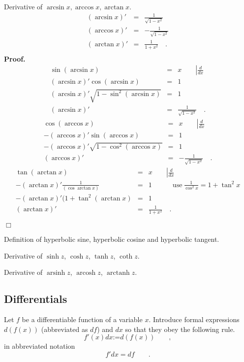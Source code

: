 \documentclass[12pt]{book}
\newcommand{\eqdef}{\textbf{:=}}
\newcommand{\importantFormula}[1]{\begin{equation} \boxed{#1} \end{equation}}
\newenvironment{proof}[1][]{ \textbf{Proof#1.} }{$\Box$\medskip}
\DeclareMathOperator{\arsinh}{arsinh}
\DeclareMathOperator{\arcosh}{arcosh}
\DeclareMathOperator{\arctanh}{arctanh}
\begin{document}
Derivative of $\arcsin x, \arccos x, \arctan x$.
\[
\begin{array}{rcl}
(\arcsin x)'&=&\frac{1}{\sqrt{1-x^2}} \\
(\arccos x)'&=&-\frac{1}{\sqrt{1-x^2}}\\
(\arctan x)'&=&\frac{1}{1+x^2}\quad .\\
\end{array}
\]
\begin{proof}
\[
\begin{array}{rcl}
\sin(\arcsin x)&=& x  \quad\quad\left|\frac{d}{dx}\right. \\
(\arcsin x)'\cos (\arcsin x) &=& 1\\
(\arcsin x)'\sqrt{1-\sin^2(\arcsin x) } &=& 1\\
(\arcsin x)' &=&\frac{1}{\sqrt{1-x^2}}\quad .
\end{array}
\]
\[
\begin{array}{rcl}
\cos(\arccos x)&=& x \quad\quad\left|\frac{d}{dx}\right. \\
-(\arccos x)'\sin (\arccos x) &=& 1\\
-(\arccos x)'\sqrt{1-\cos^2(\arccos x) } &=& 1\\
(\arccos x)' &=&-\frac{1}{\sqrt{1-x^2}}\quad .
\end{array}
\]
\[
\begin{array}{rcl}
\tan(\arctan x)&=& x \quad\quad\left|\frac{d}{dx}\right. \\
-(\arctan x)'\frac{1}{ (\cos{\arctan x})} &=& 1 \quad \quad \quad \mathrm{use~} \frac{1}{\cos^2x}= 1+\tan^2x\\
-(\arctan x)'(1+\tan^2(\arctan x) &=& 1\\
(\arctan x)' &=&\frac{1}{1+x^2}\quad .
\end{array}
\]

\end{proof}

Definition of hyperbolic sine, hyperbolic cosine and hyperbolic tangent.

Derivative of $\sinh z$, $\cosh z$, $\tanh z$, $\coth z$.

Derivative of $ \arsinh z$, $ \arcosh z$, $ \arctanh z$.
\subsection{Differentials}
Let $f$ be a differentiable function of a variable $x$. Introduce formal expressions $d(f(x))$ (abbreviated as $df$) and $dx$ so that they obey the following rule.
\importantFormula{
f'(x)d x\eqdef d(f(x))\quad \quad,
}
in abbreviated notation 
\importantFormula{
f'dx = df\quad \quad .
}
\end{document}
